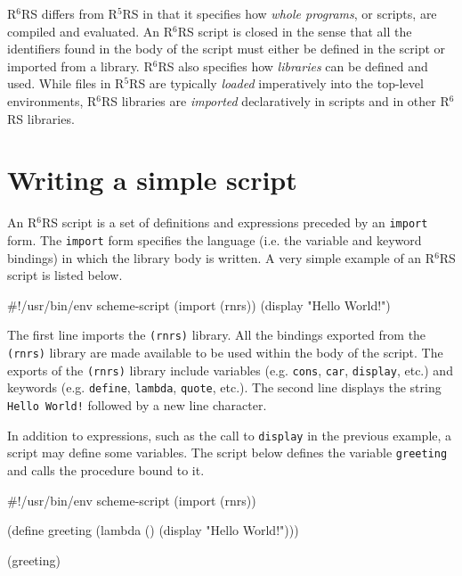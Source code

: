 \documentclass[onecolumn, 12pt, twoside, openright, dvipdfm]{book}
\newcommand{\rnrs}[1]{R$^{\mathrm{#1}}$RS}
\begin{document}
\index{R6RS Script@\rnrs{6} Script!Import} 
%
\rnrs{6} differs from \rnrs{5} in that it specifies how \emph{whole
programs}, or scripts, are compiled and evaluated.  An \rnrs{6}
script is closed in the sense that all the identifiers found in the
body of the script must either be defined in the script or imported
from a library.  \rnrs{6} also specifies how \emph{libraries} can be
defined and used.  While files in \rnrs{5} are typically
\emph{loaded} imperatively into the top-level environments, \rnrs{6}
libraries are \emph{imported} declaratively in scripts and in other
\rnrs{6} libraries. 

\section{\label{sec:scripts}Writing a simple script}

An \rnrs{6} script is a set of definitions and expressions preceded
by an \texttt{import} form.  The \texttt{import} form specifies
the language (i.e. the variable and keyword bindings) in which the
library body is written.  A very simple example of an \rnrs{6}
script is listed below.

\begin{CodeInline}
#!/usr/bin/env scheme-script
(import (rnrs))
(display "Hello World!\n")
\end{CodeInline}

The first line imports the \texttt{(rnrs)} library.  All the
bindings exported from the \texttt{(rnrs)} library are made
available to be used within the body of the script.  
The exports of the \texttt{(rnrs)} library include variables
(e.g. \texttt{cons}, \texttt{car}, \texttt{display}, etc.) and
keywords (e.g.  \texttt{define}, \texttt{lambda}, \texttt{quote},
etc.).  The second line displays the string \texttt{Hello World!}
followed by a new line character.

In addition to expressions, such as the call to \texttt{display} in
the previous example, a script may define some variables.  The
script below defines the variable \texttt{greeting} and calls the
procedure bound to it.

\begin{CodeInline}
#!/usr/bin/env scheme-script
(import (rnrs))

(define greeting
  (lambda ()
    (display "Hello World!\n")))

(greeting)
\end{CodeInline}
\end{document}

